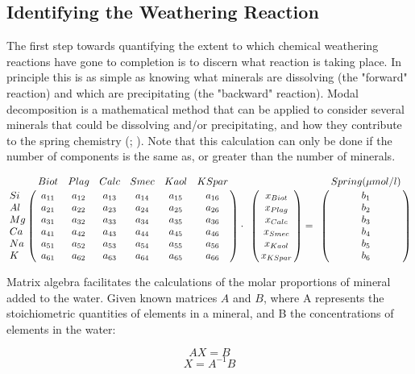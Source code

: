 \subsection{Identifying the Weathering Reaction}
\label{subsection:weathering}

The first step towards quantifying the extent to which chemical weathering reactions have gone to completion is to discern what reaction is taking place. In principle this is as simple as knowing what minerals are dissolving (the "forward" reaction) and which are precipitating (the "backward" reaction). Modal decomposition is a mathematical method that can be applied to consider several minerals that could be dissolving and/or precipitating, and how they contribute to the spring chemistry (\cite{garrelsOriginChemicalComposition1967}; \cite{dreverGeochemistryNaturalWaters1997}). Note that this calculation can only be done if the number of components is the same as, or greater than the number of minerals.


\begin{center}
\[
  \begin{bordermatrix}
{ & Biot & Plag & Calc & Smec & Kaol & KSpar \cr
Si  & a_{11}  & a_{12}  & a_{13}  & a_{14}  & a_{15}  & a_{16}  \cr
Al  & a_{21}  & a_{22}  & a_{23}  & a_{24}  & a_{25}  & a_{26}  \cr
Mg  & a_{31}  & a_{32}  & a_{33}  & a_{34}  & a_{35}  & a_{36}  \cr
Ca  & a_{41}  & a_{42}  & a_{43}  & a_{44}  & a_{45}  & a_{46}  \cr
Na  & a_{51}  & a_{52}  & a_{53}  & a_{54}  & a_{55}  & a_{56}  \cr
K   & a_{61}  & a_{62}  & a_{63}  & a_{64}  & a_{65}  & a_{66}  \cr}
  \end{bordermatrix}
  \cdot
  \begin{bordermatrix}
{ &  \cr
  & x_{Biot} \cr
  & x_{Plag} \cr
  & x_{Calc} \cr
  & x_{Smec} \cr
  & x_{Kaol} \cr
  & x_{KSpar} \cr}
  \end{bordermatrix}
  =
  \begin{bordermatrix}
{ & Spring (\mu mol/l) \cr
  & b_1 \cr
  & b_2 \cr
  & b_3 \cr
  & b_4 \cr
  & b_5 \cr
  & b_6 \cr}
  \end{bordermatrix}
\]
\end{center}
\bsk

Matrix algebra facilitates the calculations of the molar proportions of mineral added to the water. Given known matrices \( A \) and \( B \), where A represents the stoichiometric quantities of elements in a mineral, and B the concentrations of elements in the water:

\begin{equation}
AX = B
\end{equation}
\begin{equation}
X = A^{-1}B
\end{equation}

